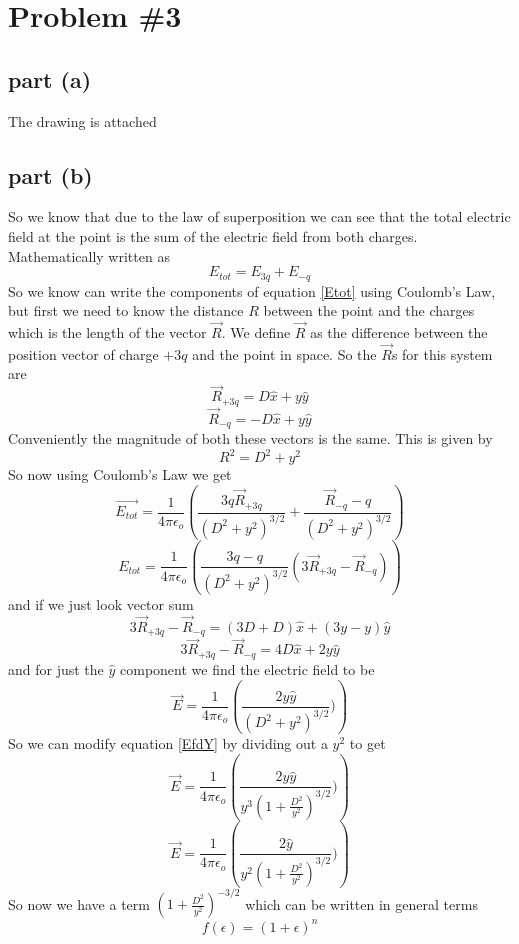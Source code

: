 \documentclass[11pt]{article}
\numberwithin{equation}{section}
\begin{document}
\section{Problem \#3}
\subsection{part (a)}
The drawing is attached
\subsection{part (b)}
So we know that due to the law of superposition we can see that the total electric field at the point is the sum of the electric field from both charges. Mathematically written as
\begin{equation}
E_{tot} = E_{3q} + E_{-q}
\label{Etot}
\end{equation}
So we know can write the components of equation \ref{Etot} using Coulomb's Law, but first we need to know the distance $R$ between the point and the charges which is the length of the vector $\vec{R}$. We define $\vec{R}$ as the difference between the position vector of charge $+3q$ and the point in space. So the $\vec{R}$s for this system are
$$\vec{R}_{+3q} = D\hat{x} + y\hat{y}$$
$$\vec{R}_{-q} = -D\hat{x} + y\hat{y}$$
Conveniently the magnitude of both these vectors is the same. This is given by
$$R^2 = D^2 + y^2$$
So now using Coulomb's Law we get
$$\vec{E_{tot}} = \frac{1}{4\pi\epsilon_o}\left(\frac{3q\vec{R}_{+3q}}{(D^2 + y^2)^{3/2}} + \frac{\vec{R}_{-q}-q}{(D^2 + y^2)^{3/2}}\right)$$
$$E_{tot} = \frac{1}{4\pi\epsilon_o}\left(\frac{3q-q}{(D^2 + y^2)^{3/2}}(3\vec{R}_{+3q}-\vec{R}_{-q})\right)$$
and if we just look vector sum
$$3\vec{R}_{+3q}-\vec{R}_{-q} = (3D + D)\hat{x} + (3y - y)\hat{y}$$
$$3\vec{R}_{+3q}-\vec{R}_{-q} = 4D\hat{x} + 2y\hat{y}$$
and for just the $\hat{y}$ component we find the electric field to be
\begin{equation}
\vec{E} = \frac{1}{4\pi\epsilon_o}\left(\frac{2y\hat{y}}{(D^2 + y^2)^{3/2}})\right)
\label{EfdY}
\end{equation}
So we can modify equation \ref{EfdY} by dividing out a $y^2$ to get
$$\vec{E} = \frac{1}{4\pi\epsilon_o}\left(\frac{2y\hat{y}}{y^3(1 +\frac{D^2}{y^2})^{3/2}})\right)$$
$$\vec{E} = \frac{1}{4\pi\epsilon_o}\left(\frac{2\hat{y}}{y^2(1 +\frac{D^2}{y^2})^{3/2}})\right)$$
So now we have a term $(1 + \frac{D^2}{y^2})^{-3/2}$ which can be written in general terms
\begin{equation}
f(\epsilon) = (1 + \epsilon)^n
\label{epsl}
\end{equation}
\end{document}
